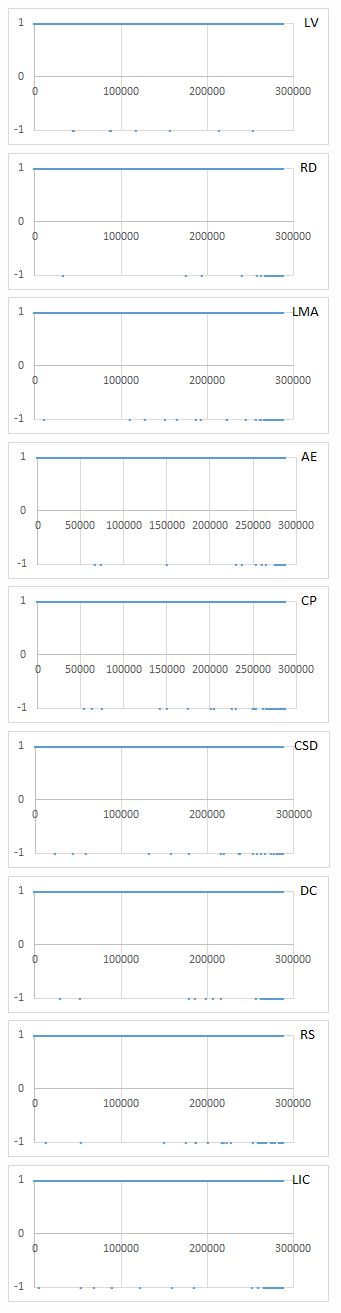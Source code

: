 \begin{figure}[ht!]
\centering
\includegraphics[width=0.32\linewidth]{tex-figures/loops/live.png}
\includegraphics[width=0.32\linewidth]{tex-figures/loops/reach-def.png}
\includegraphics[width=0.32\linewidth]{tex-figures/loops/lma.png}
\includegraphics[width=0.32\linewidth]{tex-figures/loops/avail.png}
\includegraphics[width=0.32\linewidth]{tex-figures/loops/copy.png}
\includegraphics[width=0.32\linewidth]{tex-figures/loops/csd.png}
\includegraphics[width=0.32\linewidth]{tex-figures/loops/dead.png}
\includegraphics[width=0.32\linewidth]{tex-figures/loops/fileopenclose.png}
\includegraphics[width=0.32\linewidth]{tex-figures/loops/LIC.png}

\end{figure}
